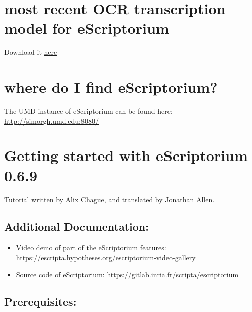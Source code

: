 \documentclass[
]{book}
\begin{document}
\hypertarget{most-recent-ocr-transcription-model-for-escriptorium}{%
\section{most recent OCR transcription model for eScriptorium}\label{most-recent-ocr-transcription-model-for-escriptorium}}

Download it \href{./2021IslamicateWorldCourse_files/arabPers-WithDiffTypefaces.mlmodel}{here}

\hypertarget{where-do-i-find-escriptorium}{%
\section{where do I find eScriptorium?}\label{where-do-i-find-escriptorium}}

The UMD instance of eScriptorium can be found here: \url{http://simorgh.umd.edu:8080/}

\hypertarget{getting-started-with-escriptorium-0.6.9}{%
\section{Getting started with eScriptorium 0.6.9}\label{getting-started-with-escriptorium-0.6.9}}

Tutorial written by \href{https://escripta.hypotheses.org/440}{Alix Chague}, and translated by Jonathan Allen.

\hypertarget{additional-documentation}{%
\subsection{Additional Documentation:}\label{additional-documentation}}

\begin{itemize}
\item
  Video demo of part of the eScriptorium features: \href{https://translate.google.com/website?sl=auto\&tl=en\&u=https://escripta.hypotheses.org/escriptorium-video-gallery}{https://escripta.hypotheses.org/escriptorium-video-gallery}
\item
  Source code of eScriptorium: \href{https://translate.google.com/website?sl=auto\&tl=en\&u=https://gitlab.inria.fr/scripta/escriptorium}{https://gitlab.inria.fr/scripta/escriptorium}
\end{itemize}

\hypertarget{prerequisites}{%
\subsection{Prerequisites:}\label{prerequisites}}
\end{document}
